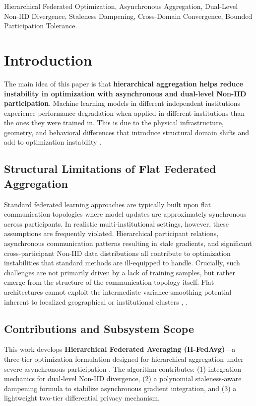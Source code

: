 \documentclass[conference]{IEEEtran}
\begin{document}
\begin{IEEEkeywords}
Hierarchical Federated Optimization, Asynchronous Aggregation, Dual-Level Non-IID Divergence, Staleness Dampening, Cross-Domain Convergence, Bounded Participation Tolerance.
\end{IEEEkeywords}

\section{Introduction}

The main idea of this paper is that \textbf{hierarchical aggregation helps reduce instability in optimization with asynchronous and dual-level Non-IID participation}. Machine learning models in different independent institutions experience performance degradation when applied in different institutions than the ones they were trained in. This is due to the physical infrastructure, geometry, and behavioral differences that introduce structural domain shifts and add to optimization instability \cite{b13}.

\subsection{Structural Limitations of Flat Federated Aggregation}
Standard federated learning approaches are typically built upon flat communication topologies where model updates are approximately synchronous across participants. In realistic multi-institutional settings, however, these assumptions are frequently violated. Hierarchical participant relations, asynchronous communication patterns resulting in stale gradients, and significant cross-participant Non-IID data distributions all contribute to optimization instabilities that standard methods are ill-equipped to handle. Crucially, such challenges are not primarily driven by a lack of training samples, but rather emerge from the structure of the communication topology itself. Flat architectures cannot exploit the intermediate variance-smoothing potential inherent to localized geographical or institutional clusters \cite{b1}, \cite{b5}.

\subsection{Contributions and Subsystem Scope}
This work develops \textbf{Hierarchical Federated Averaging (H-FedAvg)}---a three-tier optimization formulation designed for hierarchical aggregation under severe asynchronous participation \cite{b30}. The algorithm contributes: (1) integration mechanics for dual-level Non-IID divergence, (2) a polynomial staleness-aware dampening formula to stabilize asynchronous gradient integration, and (3) a lightweight two-tier differential privacy mechanism.
\end{document}
